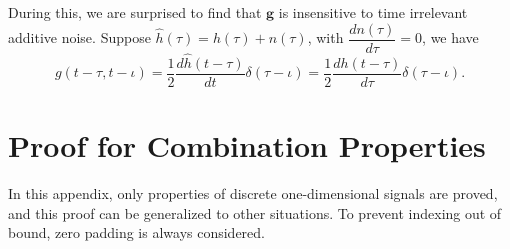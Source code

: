 \documentclass[twoside,11pt]{article}
\def\tvar#1{\mathbf{#1}} %
\begin{document}
During this, we are surprised to find that \(\tvar{g}\) is insensitive to time irrelevant additive noise.
Suppose \(\hat{h}(\tau) = h(\tau) + n(\tau)\), with \(\dfrac{d n(\tau)}{d \tau} = 0\), we have
\begin{equation*}
  g(t-\tau, t - \iota) = \dfrac{1}{2} \dfrac{d \hat{h}(t - \tau)}{d t} \delta(\tau - \iota) = \dfrac{1}{2}\dfrac{d h(t - \tau)}{d \tau} \delta(\tau - \iota).
\end{equation*}

\section{Proof for Combination Properties}
\label{appendix:proof-for-combination-properties}

In this appendix, only properties of discrete one-dimensional signals are proved, and this proof can be generalized to other situations.
To prevent indexing out of bound, zero padding is always considered.
\end{document}
